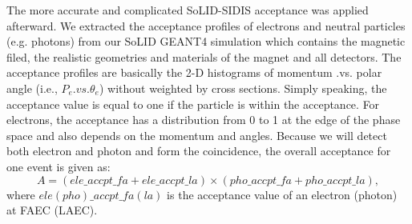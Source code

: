 \documentclass[a4paper,10.5pt]{article}
\begin{document}
 The more accurate and complicated SoLID-SIDIS acceptance was applied afterward. We extracted the acceptance profiles of electrons and neutral particles (e.g. photons) from our SoLID GEANT4 simulation which contains the magnetic filed, the realistic geometries and materials of the magnet and all detectors. The acceptance profiles are basically the 2-D histograms of momentum .vs. polar angle (i.e., $P_{e}.vs.\theta_{e}$) without weighted by cross sections. Simply speaking, the acceptance value is equal to one if the particle is within the acceptance. For electrons, the acceptance has a distribution from 0 to 1 at the edge of the phase space and also depends on the momentum and angles. Because we will detect both electron and photon and form the coincidence, the overall acceptance for one event is given as:
 \begin{equation}
     A = (ele\_accpt\_fa + ele\_accpt\_la) \times (pho\_accpt\_fa + pho\_accpt\_la),
    \label{accpt}
 \end{equation}
where $ele(pho)\_accpt\_fa(la)$ is the acceptance value of an electron (photon) at FAEC (LAEC). 
% 
% 
% 
\end{document}
